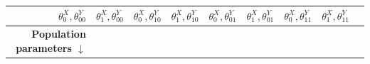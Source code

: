 \documentclass[12pt,]{book}
\begin{document}
\begin{longtable}[]{@{}rcccccccc@{}}
\begin{minipage}[b]{0.08\columnwidth}
\(\theta^X_0,\theta^Y_{00}\)\strut
\end{minipage} & \begin{minipage}[b]{0.08\columnwidth}\centering
\(\theta^X_1,\theta^Y_{00}\)\strut
\end{minipage} & \begin{minipage}[b]{0.08\columnwidth}\centering
\(\theta^X_0,\theta^Y_{10}\)\strut
\end{minipage} & \begin{minipage}[b]{0.08\columnwidth}\centering
\(\theta^X_1,\theta^Y_{10}\)\strut
\end{minipage} & \begin{minipage}[b]{0.08\columnwidth}\centering
\(\theta^X_0,\theta^Y_{01}\)\strut
\end{minipage} & \begin{minipage}[b]{0.08\columnwidth}\centering
\(\theta^X_1,\theta^Y_{01}\)\strut
\end{minipage} & \begin{minipage}[b]{0.08\columnwidth}\centering
\(\theta^X_0,\theta^Y_{11}\)\strut
\end{minipage} & \begin{minipage}[b]{0.08\columnwidth}\centering
\(\theta^X_1,\theta^Y_{11}\)\strut
\end{minipage}\tabularnewline
\midrule
\endhead
\begin{minipage}[t]{0.12\columnwidth}\raggedleft
\textbf{Population parameters \(\downarrow\)}\strut
\end{minipage} & \begin{minipage}[t]{0.08\columnwidth}\centering
\strut
\end{minipage} & \begin{minipage}[t]{0.08\columnwidth}\centering
\strut
\end{minipage} & \begin{minipage}[t]{0.08\columnwidth}\centering
\strut
\end{minipage} & \begin{minipage}[t]{0.08\columnwidth}\centering
\strut
\end{minipage} & \begin{minipage}[t]{0.08\columnwidth}\centering
\strut
\end{minipage} & \begin{minipage}[t]{0.08\columnwidth}\centering
\strut
\end{minipage} & \begin{minipage}[t]{0.08\columnwidth}\centering
\strut
\end{minipage} & \begin{minipage}[t]{0.08\columnwidth}\centering

\end{minipage}
\end{longtable}
\end{document}
